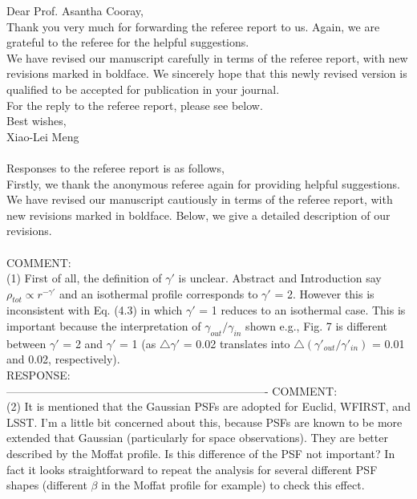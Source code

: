 \documentclass[numberedappendix,12pt,preprint]{emulateapj}
\begin{document}
Dear Prof. Asantha Cooray,
\\

Thank you very much for forwarding the referee report to us. Again, we are grateful to the referee for the helpful suggestions.
\\

We have revised our manuscript carefully in terms of the referee report, with new revisions marked in boldface. We sincerely hope that this newly revised version is qualified to be accepted for publication in your journal.
\\

For the reply to the referee report, please see below.
\\

Best wishes,
\\

Xiao-Lei Meng
\\
\\

Responses to the referee report is as follows,
\\

Firstly, we thank the anonymous referee again for providing helpful suggestions. We have revised our manuscript cautiously in terms of the referee report, with new revisions marked in boldface. Below, we give a detailed description of our revisions.
\\
\\
COMMENT:
\\
(1) First of all, the definition of $\gamma'$ is unclear. Abstract and Introduction say $\rho_{tot} \propto r^{-\gamma'}$ and an isothermal profile corresponds to $\gamma'$ = 2. However this is inconsistent with Eq. (4.3) in which $\gamma'$ = 1 reduces to an isothermal case. This is important because the  interpretation of $\gamma_{out}/\gamma_{in}$ shown e.g., Fig. 7 is different between $\gamma'$ = 2 and $\gamma'$ = 1 (as $\bigtriangleup \gamma'$ = 0.02 translates into $\bigtriangleup (\gamma'_{out}/\gamma'_{in})$ = 0.01 and 0.02, respectively).
\\

RESPONSE:
\\


----------------------------------------------------------------------
COMMENT:
\\
(2) It is mentioned that the Gaussian PSFs are adopted for Euclid, WFIRST, and LSST. I’m a little bit concerned about this, because PSFs are known to be more extended that Gaussian (particularly for space observations). They are better described by the Moffat profile. Is this difference of the PSF not important? In fact it looks straightforward to repeat the analysis for several different PSF shapes (different $\beta$ in the Moffat profile for example) to check this effect.
\\
\end{document}
